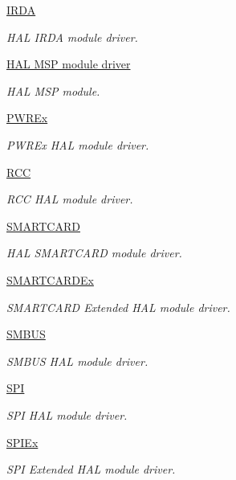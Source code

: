 \begin{DoxyCompactItemize}
\hyperlink{group___i_r_d_a}{I\+R\+DA}
\begin{DoxyCompactList}\small\item\em H\+AL I\+R\+DA module driver. \end{DoxyCompactList}\item 
\hyperlink{group___h_a_l___m_s_p}{H\+A\+L M\+S\+P module driver}
\begin{DoxyCompactList}\small\item\em H\+AL M\+SP module. \end{DoxyCompactList}\item 
\hyperlink{group___p_w_r_ex}{P\+W\+R\+Ex}
\begin{DoxyCompactList}\small\item\em P\+W\+R\+Ex H\+AL module driver. \end{DoxyCompactList}\item 
\hyperlink{group___r_c_c}{R\+CC}
\begin{DoxyCompactList}\small\item\em R\+CC H\+AL module driver. \end{DoxyCompactList}\item 
\hyperlink{group___s_m_a_r_t_c_a_r_d}{S\+M\+A\+R\+T\+C\+A\+RD}
\begin{DoxyCompactList}\small\item\em H\+AL S\+M\+A\+R\+T\+C\+A\+RD module driver. \end{DoxyCompactList}\item 
\hyperlink{group___s_m_a_r_t_c_a_r_d_ex}{S\+M\+A\+R\+T\+C\+A\+R\+D\+Ex}
\begin{DoxyCompactList}\small\item\em S\+M\+A\+R\+T\+C\+A\+RD Extended H\+AL module driver. \end{DoxyCompactList}\item 
\hyperlink{group___s_m_b_u_s}{S\+M\+B\+US}
\begin{DoxyCompactList}\small\item\em S\+M\+B\+US H\+AL module driver. \end{DoxyCompactList}\item 
\hyperlink{group___s_p_i}{S\+PI}
\begin{DoxyCompactList}\small\item\em S\+PI H\+AL module driver. \end{DoxyCompactList}\item 
\hyperlink{group___s_p_i_ex}{S\+P\+I\+Ex}
\begin{DoxyCompactList}\small\item\em S\+PI Extended H\+AL module driver. \end{DoxyCompactList}\item 

\end{DoxyCompactItemize}

